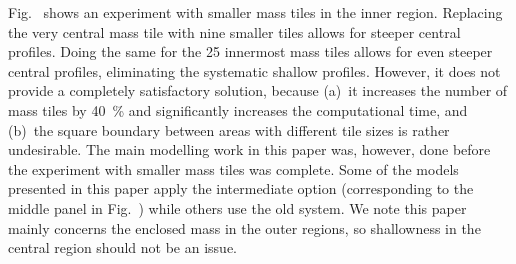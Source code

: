 Fig.~ shows an experiment with smaller mass
tiles in the inner region.  Replacing the very central mass tile with
nine smaller tiles allows for steeper central profiles.  Doing the same
for the 25 innermost mass tiles allows for even steeper central
profiles, eliminating the systematic shallow profiles.  However, 
it does not provide a completely satisfactory solution, because (a)~it increases
the number of mass tiles by \SI{40}{\%} and significantly increases the
computational time, and (b)~the square boundary between areas with
different tile sizes is rather undesirable.
The main modelling work in this paper was, however, done before the
experiment with smaller mass tiles was complete.  Some of the models
presented in this paper apply the intermediate option (corresponding
to the middle panel in Fig.~) while others use
the old system.  We note this paper mainly concerns the enclosed mass
in the outer regions, so shallowness in the central region should not be
an issue.

